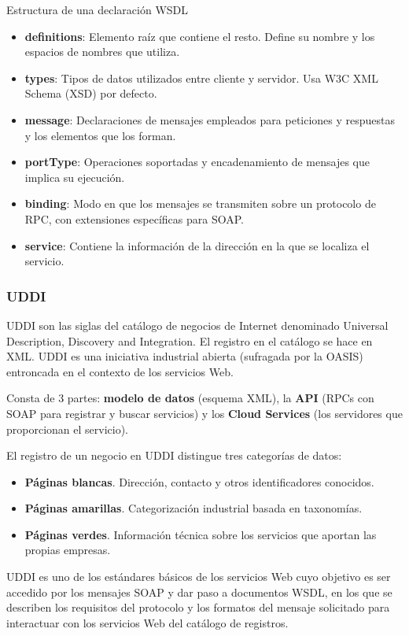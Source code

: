 Estructura de una declaración WSDL
\begin{itemize}
\item \textbf{definitions}: Elemento raíz que contiene el resto. Define su
nombre y los espacios de nombres que utiliza.
\item \textbf{types}: Tipos de datos utilizados entre cliente y servidor. Usa
W3C XML Schema (XSD) por defecto.
\item \textbf{message}: Declaraciones de mensajes empleados para
peticiones y respuestas y los elementos que los forman.
\item \textbf{portType}: Operaciones soportadas y encadenamiento de
mensajes que implica su ejecución.
\item \textbf{binding}: Modo en que los mensajes se transmiten sobre un
protocolo de RPC, con extensiones específicas para SOAP.
\item \textbf{service}: Contiene la información de la dirección en la que se
localiza el servicio.

\end{itemize}

\subsubsection{UDDI}
\begin{defn}[UDDI]
UDDI son las siglas del catálogo de negocios de Internet denominado Universal Description, Discovery and Integration. El registro en el catálogo se hace en XML. UDDI es una iniciativa industrial abierta (sufragada por la OASIS) entroncada en el contexto de los servicios Web.
\end{defn}

Consta de 3 partes: \textbf{modelo de datos} (esquema XML), la \textbf{API} (RPCs con SOAP para registrar y buscar servicios) y los \textbf{Cloud Services} (los servidores que proporcionan el servicio).

El registro de un negocio en UDDI distingue tres categorías de datos:
\begin{itemize}
\item \textbf{Páginas blancas}. Dirección, contacto y otros identificadores conocidos.
\item \textbf{Páginas amarillas}. Categorización industrial basada en taxonomías.
\item \textbf{Páginas verdes}. Información técnica sobre los servicios que aportan las propias empresas.
\end{itemize}
UDDI es uno de los estándares básicos de los servicios Web cuyo objetivo es ser accedido por los mensajes SOAP y dar paso a documentos WSDL, en los que se describen los requisitos del protocolo y los formatos del mensaje solicitado para interactuar con los servicios Web del catálogo de registros.


